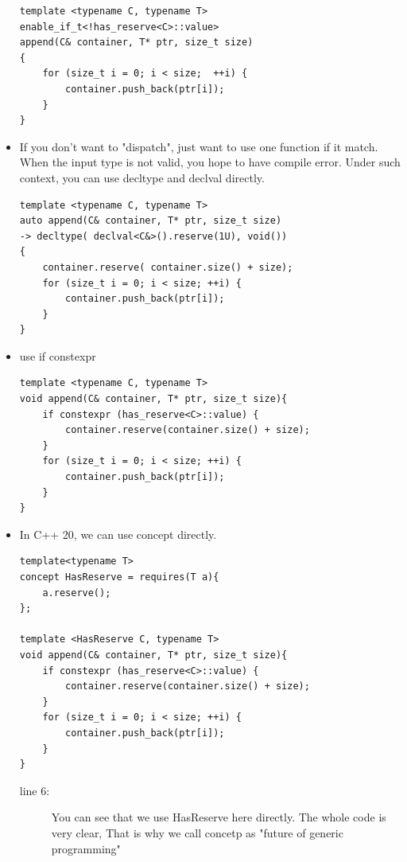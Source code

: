 \documentclass[a4paper,11pt,twoside]{book}
\begin{document}
\begin{itemize}
\begin{lstlisting}
template <typename C, typename T>
enable_if_t<!has_reserve<C>::value>
append(C& container, T* ptr, size_t size)
{
	for (size_t i = 0; i < size;  ++i) {
        container.push_back(ptr[i]); 
    }
}
\end{lstlisting}

	\item If you don't want to "dispatch", just want to use one function if it match.  When the input type is not valid, you hope to have compile error. Under such context, you can use decltype and declval directly.

\begin{lstlisting}[numbers=none]
template <typename C, typename T>
auto append(C& container, T* ptr, size_t size)
-> decltype( declval<C&>().reserve(1U), void()) 
{
	container.reserve( container.size() + size);
	for (size_t i = 0; i < size; ++i) {
		container.push_back(ptr[i]);
	}
}
\end{lstlisting}

\item use if constexpr
\begin{lstlisting}
template <typename C, typename T>
void append(C& container, T* ptr, size_t size){
    if constexpr (has_reserve<C>::value) {
        container.reserve(container.size() + size);
    }
    for (size_t i = 0; i < size; ++i) {
        container.push_back(ptr[i]);
    }
}   
\end{lstlisting}
\item In C++ 20, we can use concept directly.
\begin{lstlisting}
template<typename T>
concept HasReserve = requires(T a){
    a.reserve();
};

template <HasReserve C, typename T>
void append(C& container, T* ptr, size_t size){
    if constexpr (has_reserve<C>::value) {
        container.reserve(container.size() + size);
    }
    for (size_t i = 0; i < size; ++i) {
        container.push_back(ptr[i]);
    }
} 
\end{lstlisting}
\begin{description}
    \item[line 6:] You can see that we use HasReserve here directly. The whole code is very clear, That is why we call concetp as "future of generic programming" 
\end{description}

\end{itemize}
\end{document}

